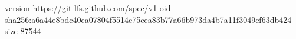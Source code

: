 version https://git-lfs.github.com/spec/v1
oid sha256:a6a44e8bdc40ea07804f5514c75cea83b77a66b973da4b7a11f3049cf63db424
size 87544
